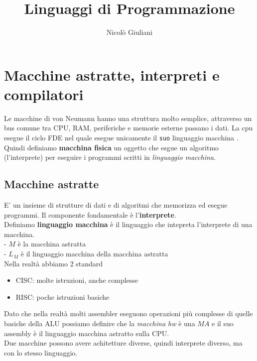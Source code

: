 \documentclass[a4paper,12pt]{article}
\title{Linguaggi di Programmazione}
\author{Nicolò Giuliani}
\date{}
\begin{document}
\maketitle
\tableofcontents   %
\newpage 

\section{Macchine astratte, interpreti e compilatori}
Le macchine di von Neumann hanno una struttura molto semplice, attraverso un bus comune tra CPU, RAM, periferiche e memorie esterne passano i dati. La cpu esegue il ciclo FDE nel quale esegue unicamente il \texttt{suo} linguaggio macchina . \\
Quindi definiamo \textbf{macchina fisica} un oggetto che esgue un algoritmo (l'interprete) per eseguire i programmi scritti in \textit{linguaggio macchina}.
\subsection*{Macchine astratte}
E' un insieme di strutture di dati e di algoritmi che memorizza ed esegue programmi. Il componente fondamentale è l'\textbf{interprete}. \\
Definiamo \textbf{linguaggio macchina} è il linguaggio che intepreta l'interprete di una macchina. \\
- $M$ è la macchina astratta \\
- $L_M$ è il linguaggio macchina della macchina astratta
\vspace{2em} \\
Nella realtà abbiamo 2 standard
\begin{itemize}
  \item CISC: molte istruzioni, anche complesse
  \item RISC: poche istruzioni basiche
\end{itemize}
Dato che nella realtà molti assembler eseguono operazioni più complesse di quelle basiche della ALU possiamo definire che la \textit{macchina hw} è una $MA$ e il suo assembly è il linguaggio macchina astratto sulla CPU. \\
Due macchine possono avere achitetture diverse, quindi interprete diverso, ma con lo stesso linguaggio.
\end{document}
